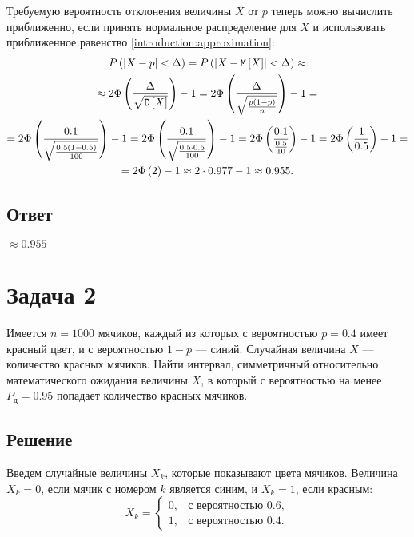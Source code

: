 Требуемую вероятность отклонения величины $X$ от $p$ теперь можно вычислить приближенно, если принять нормальное распределение для $X$ и использовать приближенное
равенство \eqref{introduction:approximation}:
\begin{multline}
    P \left ( \left | X - p \right | < \Delta \right )
    = P \left ( \left | X - \mathtt{M} \left [ X \right ] \right | < \Delta \right ) \approx \\
    \approx 2 \Phi \left ( \frac{\Delta}{\sqrt{\mathtt{D} \left [ X \right ]}} \right ) - 1
    = 2 \Phi \left ( \frac{\Delta}{\sqrt{\frac{p (1-p)}{n}}} \right ) - 1 = \\
    = 2 \Phi \left ( \frac{0.1}{\sqrt{\frac{0.5 (1-0.5)}{100}}} \right ) - 1
    = 2 \Phi \left ( \frac{0.1}{\sqrt{\frac{0.5 \cdot 0.5}{100}}} \right ) - 1
    = 2 \Phi \left ( \frac{0.1}{\frac{0.5}{10}} \right ) - 1
    = 2 \Phi \left ( \frac{1}{0.5} \right ) - 1 = \\
    = 2 \Phi \left ( 2 \right ) - 1
    \approx 2 \cdot 0.977 - 1
    \approx 0.955 .
\end{multline}

\subsection*{Ответ}
$\approx 0.955$

\section*{Задача 2}

Имеется $n = 1000$ мячиков, каждый из которых с вероятностью $p = 0.4$ имеет красный цвет, и с вероятностью $1 - p$ --- синий.
Случайная величина $X$ --- количество красных мячиков. Найти интервал, симметричный относительно математического ожидания величины $X$,
в который с вероятностью на менее $P_\text{д} = 0.95$ попадает количество красных мячиков.
\subsection*{Решение}
Введем случайные величины $X_k$, которые показывают цвета мячиков. Величина $X_k = 0$, если мячик с номером $k$ является синим, и $X_k = 1$, если красным:
\begin{equation}
    X_k =
    \left \{
    \begin{array}{ll}
        0, & \text{с вероятностью } 0.6 , \\
        1, & \text{с вероятностью } 0.4 .
    \end{array}
    \right .
\end{equation}

